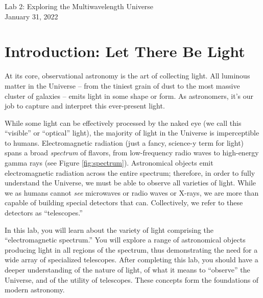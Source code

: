 \documentclass[11pt]{article}
\begin{document}
\begin{center}
\huge{Lab 2: Exploring the Multiwavelength Universe}\\ \medskip \Large{January 31, 2022}
\end{center}

\section{Introduction: Let There Be Light}
At its core, observational astronomy is the art of collecting light. All luminous matter in the Universe -- from the tiniest grain of dust to the most massive cluster of galaxies -- emits light in some shape or form. As astronomers, it's our job to capture and interpret this ever-present light.

\medskip \noindent
While some light can be effectively processed by the naked eye (we call this ``visible'' or ``optical'' light), the majority of light in the Universe is imperceptible to humans. Electromagnetic radiation (just a fancy, science-y term for light) spans a broad \emph{spectrum} of flavors, from low-frequency radio waves to high-energy gamma rays (see Figure \ref{fig:spectrum}). Astronomical objects emit electromagnetic radiation across the entire spectrum; therefore, in order to fully understand the Universe, we must be able to observe all varieties of light. While we as humans cannot \emph{see} microwaves or radio waves or X-rays, we are more than capable of building special detectors that can. Collectively, we refer to these detectors as ``telescopes.''

\medskip \noindent
In this lab, you will learn about the variety of light comprising the ``electromagnetic spectrum.'' You will explore a range of astronomical objects producing light in all regions of the spectrum, thus demonstrating the need for a wide array of specialized telescopes. After completing this lab, you should have a deeper understanding of the nature of light, of what it means to ``observe'' the Universe, and of the utility of telescopes. These concepts form the foundations of modern astronomy. 

\end{document}
